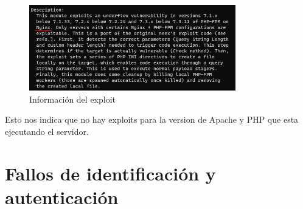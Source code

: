 \documentclass{report}
\begin{document}
                \begin{figure}[H]
                    \centering
                    \includegraphics[width=0.8\textwidth]{./img/vulnerabilidades/2.5/1.3.png}
                    \caption{Información del exploit}
                \end{figure}
                Esto nos indica que no hay exploits para la version de Apache y PHP que esta ejecutando el servidor.\\
                \clearpage
        \section{Fallos de identificación y autenticación}
\end{document}
